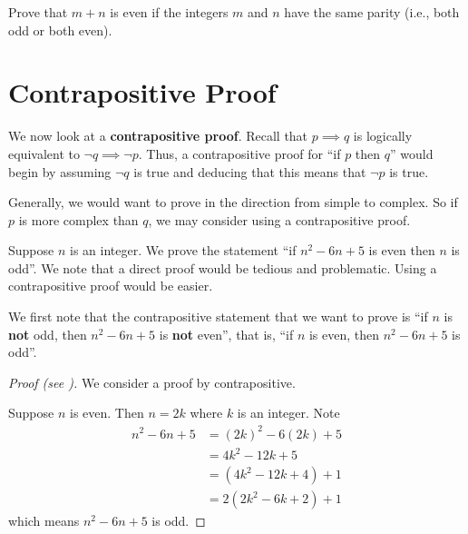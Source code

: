 \begin{exercise}
    Prove that $m + n$ is even if the integers $m$ and $n$ have the same parity (i.e., both odd or both even).
\end{exercise}

\section{Contrapositive Proof}
We now look at a \textbf{contrapositive proof}. Recall that $p \implies q$ is logically equivalent to $\lnot q \implies \lnot p$. Thus, a contrapositive proof for ``if $p$ then $q$'' would begin by assuming $\lnot q$ is true and deducing that this means that $\lnot p$ is true.

Generally, we would want to prove in the direction from simple to complex. So if $p$ is more complex than $q$, we may consider using a contrapositive proof.

\begin{example}\label{example-if-(n-1)(n-5)-is-even-then-n-is-odd}
    Suppose $n$ is an integer. We prove the statement ``if $n^2 - 6n + 5$ is even then $n$ is odd''. We note that a direct proof would be tedious and problematic. Using a contrapositive proof would be easier.

    We first note that the contrapositive statement that we want to prove is ``if $n$ is \textbf{not} odd, then $n^2 - 6n + 5$ is \textbf{not} even'', that is, ``if $n$ is even, then $n^2 - 6n + 5$ is odd''.
    \begin{proof}[Proof (see {\cite[p.~130]{hammack_2018}})]
        We consider a proof by contrapositive.

        Suppose $n$ is even. Then $n = 2k$ where $k$ is an integer. Note
        \begin{align*}
            n^2 - 6n + 5 &= (2k)^2 - 6(2k) + 5\\
            &= 4k^2 - 12k + 5\\
            &= (4k^2 - 12k + 4) + 1\\
            &= 2(2k^2 - 6k + 2) + 1
        \end{align*}
        which means $n^2 - 6n + 5$ is odd.
    \end{proof}
\end{example}

